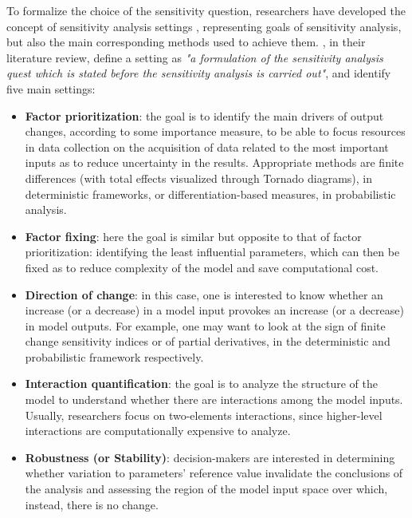 To formalize the choice of the sensitivity question, researchers have developed the concept of sensitivity analysis settings \cite{Saltelli2002SensitivityAF, Saltelli2002OnTR}, representing goals of sensitivity analysis, but also the main corresponding methods used to achieve them. \textcite{Borgonovo2016SensitivityAA}, in their literature review, define a setting as \textit{"a formulation of the sensitivity analysis quest which is stated before the sensitivity analysis is carried out"}, and identify five main settings:
\begin{itemize} \label{sa_settings}
    \item \textbf{Factor prioritization}: the goal is to identify the main drivers of output changes, according to some importance measure, to be able to focus resources in data collection on the acquisition of data related to the most important inputs as to reduce uncertainty in the results. Appropriate methods are finite differences (with total effects visualized through Tornado diagrams), in deterministic frameworks, or differentiation-based measures, in probabilistic analysis.
    \item \textbf{Factor fixing}: here the goal is similar but opposite to that of factor prioritization: identifying the least influential parameters, which can then be fixed as to reduce complexity of the model and save computational cost.
    \item \textbf{Direction of change}: in this case, one is interested to know whether an increase (or a decrease) in a model input provokes an increase (or a decrease) in model outputs. For example, one may want to look at the sign of finite change sensitivity indices or of partial derivatives, in the deterministic and probabilistic framework respectively.
    \item \textbf{Interaction quantification}: the goal is to analyze the structure of the model to understand whether there are interactions among the model inputs. Usually, researchers focus on two-elements interactions, since higher-level interactions are computationally expensive to analyze.
    \item \textbf{Robustness (or Stability)}: decision-makers are interested in determining whether variation to parameters' reference value invalidate the conclusions of the analysis and assessing the region of the model input space over which, instead, there is no change.
\end{itemize}



